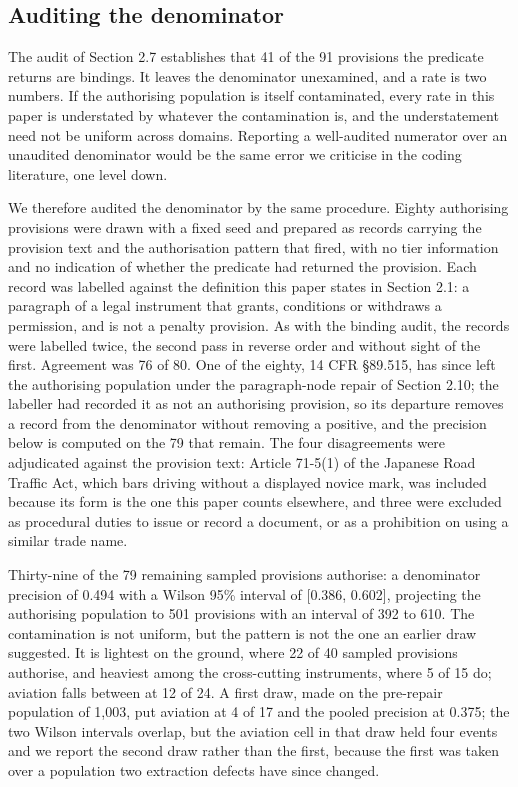 \subsection{Auditing the denominator}\label{sec:2.8}

The audit of Section 2.7 establishes that 41 of the 91 provisions the predicate returns are bindings. It leaves the denominator unexamined, and a rate is two numbers. If the authorising population is itself contaminated, every rate in this paper is understated by whatever the contamination is, and the understatement need not be uniform across domains. Reporting a well-audited numerator over an unaudited denominator would be the same error we criticise in the coding literature, one level down.

We therefore audited the denominator by the same procedure. Eighty authorising provisions were drawn with a fixed seed and prepared as records carrying the provision text and the authorisation pattern that fired, with no tier information and no indication of whether the predicate had returned the provision. Each record was labelled against the definition this paper states in Section 2.1: a paragraph of a legal instrument that grants, conditions or withdraws a permission, and is not a penalty provision. As with the binding audit, the records were labelled twice, the second pass in reverse order and without sight of the first. Agreement was 76 of 80. One of the eighty, 14 CFR \S{}89.515, has since left the authorising population under the paragraph-node repair of Section 2.10; the labeller had recorded it as not an authorising provision, so its departure removes a record from the denominator without removing a positive, and the precision below is computed on the 79 that remain. The four disagreements were adjudicated against the provision text: Article 71-5(1) of the Japanese Road Traffic Act, which bars driving without a displayed novice mark, was included because its form is the one this paper counts elsewhere, and three were excluded as procedural duties to issue or record a document, or as a prohibition on using a similar trade name.

Thirty-nine of the 79 remaining sampled provisions authorise: a denominator precision of 0.494 with a Wilson 95\% interval of [0.386, 0.602], projecting the authorising population to 501 provisions with an interval of 392 to 610. The contamination is not uniform, but the pattern is not the one an earlier draw suggested. It is lightest on the ground, where 22 of 40 sampled provisions authorise, and heaviest among the cross-cutting instruments, where 5 of 15 do; aviation falls between at 12 of 24. A first draw, made on the pre-repair population of 1,003, put aviation at 4 of 17 and the pooled precision at 0.375; the two Wilson intervals overlap, but the aviation cell in that draw held four events and we report the second draw rather than the first, because the first was taken over a population two extraction defects have since changed.

